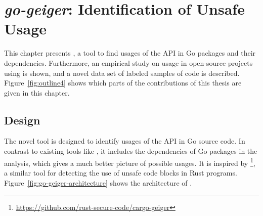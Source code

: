 
\chapter{\textit{go-geiger}: Identification of Unsafe Usage}\label{ch:go-geiger}

This chapter presents \toolGeiger{}, a tool to find usages of the \unsafe{} \acrshort{API} in Go packages and their
dependencies.
Furthermore, an empirical study on \unsafe{} usage in open-source projects using \toolGeiger{} is shown, and a novel
data set of labeled samples of \unsafe{} code is described.
Figure~\ref{fig:outline4} shows which parts of the contributions of this thesis are given in this chapter.





\section{Design}\label{sec:go-geiger:design}

The novel tool \toolGeiger{} is designed to identify usages of the \unsafe{} \acrshort{API} in Go source code.
In contrast to existing tools like \toolGosec{}, it includes the dependencies of Go packages in the analysis, which
gives a much better picture of possible \unsafe{} usages.
It is inspired by \toolCargoGeiger{}\footnote{\url{https://github.com/rust-secure-code/cargo-geiger}}, a similar tool
for detecting the use of unsafe code blocks in Rust programs.
Figure~\ref{fig:go-geiger-architecture} shows the architecture of \toolGeiger{}.



